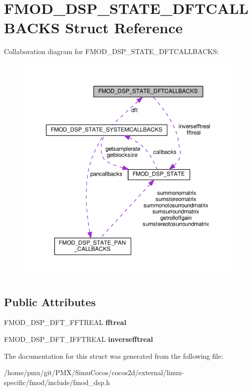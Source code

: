 \hypertarget{structFMOD__DSP__STATE__DFTCALLBACKS}{}\section{F\+M\+O\+D\+\_\+\+D\+S\+P\+\_\+\+S\+T\+A\+T\+E\+\_\+\+D\+F\+T\+C\+A\+L\+L\+B\+A\+C\+KS Struct Reference}
\label{structFMOD__DSP__STATE__DFTCALLBACKS}


Collaboration diagram for F\+M\+O\+D\+\_\+\+D\+S\+P\+\_\+\+S\+T\+A\+T\+E\+\_\+\+D\+F\+T\+C\+A\+L\+L\+B\+A\+C\+KS\+:
\nopagebreak
\begin{figure}[H]
\begin{center}
\leavevmode
\includegraphics[width=350pt]{structFMOD__DSP__STATE__DFTCALLBACKS__coll__graph}
\end{center}
\end{figure}
\subsection*{Public Attributes}
\begin{DoxyCompactItemize}
\item 
\mbox{\label{structFMOD__DSP__STATE__DFTCALLBACKS_a2a5e6e3ee6eb3caba6bb950ab0fc9656}} 
F\+M\+O\+D\+\_\+\+D\+S\+P\+\_\+\+D\+F\+T\+\_\+\+F\+F\+T\+R\+E\+AL {\bfseries fftreal}
\item 
\mbox{\label{structFMOD__DSP__STATE__DFTCALLBACKS_a937e913d079c15ff2c4ecfd40b08cfc1}} 
F\+M\+O\+D\+\_\+\+D\+S\+P\+\_\+\+D\+F\+T\+\_\+\+I\+F\+F\+T\+R\+E\+AL {\bfseries inversefftreal}
\end{DoxyCompactItemize}


The documentation for this struct was generated from the following file\+:\begin{DoxyCompactItemize}
\item 
/home/pmx/git/\+P\+M\+X/\+Simu\+Cocos/cocos2d/external/linux-\/specific/fmod/include/fmod\+\_\+dsp.\+h\end{DoxyCompactItemize}
